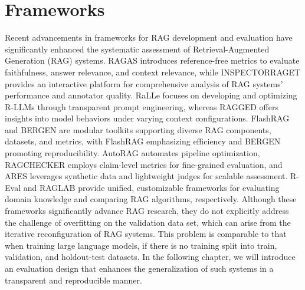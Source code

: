 \section{Frameworks}
Recent advancements in frameworks for RAG development and evaluation have significantly enhanced the systematic assessment of Retrieval-Augmented Generation (RAG) systems. RAGAS\cite{Es.2023} introduces reference-free metrics to evaluate faithfulness, answer relevance, and context relevance, while INSPECTORRAGET\cite{Fadnis.26.04.2024} provides an interactive platform for comprehensive analysis of RAG systems' performance and annotator quality. RaLLe\cite{Hoshi.8212023b} focuses on developing and optimizing R-LLMs through transparent prompt engineering, whereas RAGGED\cite{JenniferHsia.2024} offers insights into model behaviors under varying context configurations. FlashRAG\cite{Jin.5222024} and BERGEN\cite{Rau.01.07.2024} are modular toolkits supporting diverse RAG components, datasets, and metrics, with FlashRAG emphasizing efficiency and BERGEN promoting reproducibility. AutoRAG\cite{Kim.10282024} automates pipeline optimization, RAGCHECKER\cite{Ru.15.08.2024} employs claim-level metrics for fine-grained evaluation, and ARES\cite{SaadFalcon.16.11.2023} leverages synthetic data and lightweight judges for scalable assessment. R-Eval\cite{Tu.2024} and RAGLAB\cite{Zhang.8212024} provide unified, customizable frameworks for evaluating domain knowledge and comparing RAG algorithms, respectively. Although these frameworks significantly advance RAG research, they do not explicitly address the challenge of overfitting on the validation data set, which can arise from the iterative reconfiguration of RAG systems. This problem is comparable to that when training large language models, if there is no training split into train, validation, and holdout-test datasets. In the following chapter, we will introduce an evaluation design that enhances the generalization of such systems in a transparent and reproducible manner.

